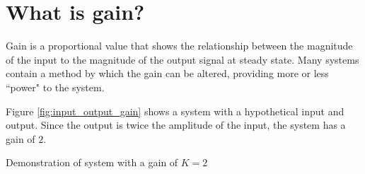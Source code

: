 \section{What is gain?}

Gain is a proportional value that shows the relationship between the magnitude
of the input to the magnitude of the output signal at steady state. Many
\glspl{system} contain a method by which the gain can be altered, providing more
or less ``power" to the \gls{system}.

Figure \ref{fig:input_output_gain} shows a \gls{system} with a hypothetical
input and output. Since the output is twice the amplitude of the input, the
\gls{system} has a gain of $2$.

\begin{bookfigure}

  \caption{Demonstration of system with a gain of $K = 2$}
  \label{fig:input_output_gain}
\end{bookfigure}
